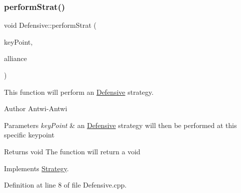\subsubsection{\texorpdfstring{perform\+Strat()}{performStrat()}}
{\footnotesize\ttfamily void Defensive\+::perform\+Strat (\begin{DoxyParamCaption}\item[{\hyperlink{classKeyPoint}{Key\+Point} $\ast$}]{key\+Point,  }\item[{\hyperlink{classAlliance}{Alliance} $\ast$}]{alliance }\end{DoxyParamCaption})\hspace{0.3cm}{\ttfamily [virtual]}}



This function will perform an \hyperlink{classDefensive}{Defensive} strategy. 

\begin{DoxyAuthor}{Author}
Antwi-\/\+Antwi
\end{DoxyAuthor}

\begin{DoxyParams}{Parameters}
{\em key\+Point} & an \hyperlink{classDefensive}{Defensive} strategy will then be performed at this specific keypoint\\
\hline
\end{DoxyParams}
\begin{DoxyReturn}{Returns}
void The function will return a void 
\end{DoxyReturn}


Implements \hyperlink{classStrategy_aa0692005cb67d0ee2441046f6b302e7d}{Strategy}.



Definition at line 8 of file Defensive.\+cpp.


